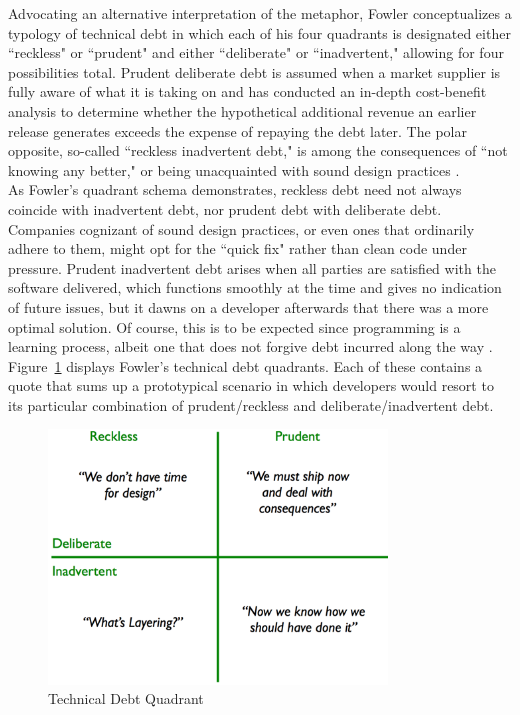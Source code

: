 Advocating an alternative interpretation of the metaphor, Fowler \cite{fowler} conceptualizes a typology of technical debt in which each of his four quadrants is designated either ``reckless" or ``prudent" and either ``deliberate" or ``inadvertent," allowing for four possibilities total. Prudent deliberate debt is assumed when a market supplier is fully aware of what it is taking on and has conducted an in-depth cost-benefit analysis to determine whether the hypothetical additional revenue an earlier release generates exceeds the expense of repaying the debt later. The polar opposite, so-called ``reckless inadvertent debt," is among the consequences of ``not knowing any better," or being unacquainted with sound design practices \cite{fowler}.\\
As Fowler's quadrant schema demonstrates, reckless debt need not always coincide with inadvertent debt, nor prudent debt with deliberate debt. Companies cognizant of sound design practices, or even ones that ordinarily adhere to them, might opt for the ``quick fix" rather than clean code under pressure. Prudent inadvertent debt arises when all parties are satisfied with the software delivered, which functions smoothly at the time and gives no indication of future issues, but it dawns on a developer afterwards that there was a more optimal solution. Of course, this is to be expected since programming is a learning process, albeit one that does not forgive debt incurred along the way \cite{fowler}.\\
Figure~\ref{fig:technical_debt_quadrant} displays Fowler's technical debt quadrants. Each of these contains a quote that sums up a prototypical scenario in which developers would resort to its particular combination of prudent/reckless and deliberate/inadvertent debt.\\

\begin{figure}[th]
	\centering
	\includegraphics[width=90mm]{figures/chapter2/technicalDebtQuadrant}
	\caption{Technical Debt Quadrant}
	\label{fig:technical_debt_quadrant}
\end{figure}


